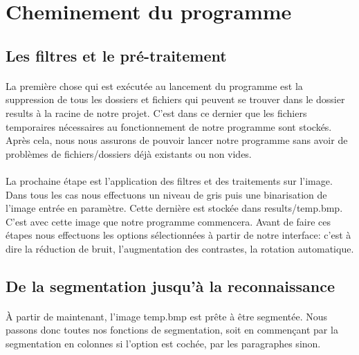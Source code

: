 \documentclass{article}
\begin{document}
\newpage
{}
\section{Cheminement du programme}

\subsection{Les filtres et le pré-traitement}

\paragraph{}La première chose qui est exécutée au lancement du programme est la suppression de tous les dossiers et fichiers qui peuvent se trouver dans le dossier results à la racine de notre projet. C'est dans ce dernier que les fichiers temporaires nécessaires au fonctionnement de notre programme sont stockés. Après cela, nous nous assurons de pouvoir lancer notre programme sans avoir de problèmes de fichiers/dossiers déjà existants ou non vides.

\paragraph{}La prochaine étape est l'application des filtres et des traitements sur l'image. Dans tous les cas nous effectuons un niveau de gris puis une binarisation de l'image entrée en paramètre. Cette dernière est stockée dans results/temp.bmp. C'est avec cette image que notre programme commencera. Avant de faire ces étapes nous effectuons les options sélectionnées à partir de notre interface: c'est à dire la réduction de bruit, l'augmentation des contrastes, la rotation automatique.

\subsection{De la segmentation jusqu'à la reconnaissance}

\paragraph{}À partir de maintenant, l'image temp.bmp est prête à être segmentée. Nous passons donc toutes nos fonctions de segmentation, soit en commençant par la segmentation en colonnes si l'option est cochée, par les paragraphes sinon.
\end{document}
